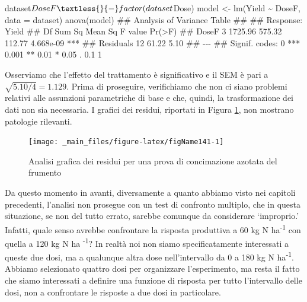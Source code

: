 \documentclass[a4paper,12pt,oneside]{book}
\newenvironment{Shaded}{\begin{snugshade}}{\end{snugshade}}
\newcommand{\SpecialCharTok}[1]{#1}
\newcommand{\DocumentationTok}[1]{#1}
\newcommand{\OtherTok}[1]{#1}
\newcommand{\FunctionTok}[1]{#1}
\newcommand{\AttributeTok}[1]{#1}
\newcommand{\NormalTok}[1]{#1}
\begin{document}
\begin{Shaded}
\begin{Highlighting}[]
\NormalTok{dataset}\SpecialCharTok{$}\NormalTok{DoseF }\OtherTok{\textless{}{-}} \FunctionTok{factor}\NormalTok{(dataset}\SpecialCharTok{$}\NormalTok{Dose)}
\NormalTok{model }\OtherTok{\textless{}{-}} \FunctionTok{lm}\NormalTok{(Yield }\SpecialCharTok{\textasciitilde{}}\NormalTok{ DoseF, }\AttributeTok{data =}\NormalTok{ dataset)}
\FunctionTok{anova}\NormalTok{(model)}
\DocumentationTok{\#\# Analysis of Variance Table}
\DocumentationTok{\#\# }
\DocumentationTok{\#\# Response: Yield}
\DocumentationTok{\#\#           Df  Sum Sq Mean Sq F value    Pr(\textgreater{}F)    }
\DocumentationTok{\#\# DoseF      3 1725.96  575.32  112.77 4.668e{-}09 ***}
\DocumentationTok{\#\# Residuals 12   61.22    5.10                      }
\DocumentationTok{\#\# {-}{-}{-}}
\DocumentationTok{\#\# Signif. codes:  0 \textquotesingle{}***\textquotesingle{} 0.001 \textquotesingle{}**\textquotesingle{} 0.01 \textquotesingle{}*\textquotesingle{} 0.05 \textquotesingle{}.\textquotesingle{} 0.1 \textquotesingle{} \textquotesingle{} 1}
\end{Highlighting}
\end{Shaded}

Osserviamo che l'effetto del trattamento è significativo e il SEM è pari a \(\sqrt{5.10/4} = 1.129\). Prima di proseguire, verifichiamo che non ci siano problemi relativi alle assunzioni parametriche di base e che, quindi, la trasformazione dei dati non sia necessaria. I grafici dei residui, riportati in Figura \ref{fig:figName141}, non mostrano patologie rilevanti.

\begin{figure}

{\centering \texttt{[image: \_main\_files/figure-latex/figName141-1]} 

}

\caption{Analisi grafica dei residui per una prova di concimazione azotata del frumento}\label{fig:figName141}
\end{figure}

Da questo momento in avanti, diversamente a quanto abbiamo visto nei capitoli precedenti, l'analisi non prosegue con un test di confronto multiplo, che in questa situazione, se non del tutto errato, sarebbe comunque da considerare `improprio.' Infatti, quale senso avrebbe confrontare la risposta produttiva a 60 kg N ha\textsuperscript{-1} con quella a 120 kg N ha \textsuperscript{-1}? In realtà noi non siamo specificatamente interessati a queste due dosi, ma a qualunque altra dose nell'intervallo da 0 a 180 kg N ha\textsuperscript{-1}. Abbiamo selezionato quattro dosi per organizzare l'esperimento, ma resta il fatto che siamo interessati a definire una funzione di risposta per tutto l'intervallo delle dosi, non a confrontare le risposte a due dosi in particolare.
\end{document}
